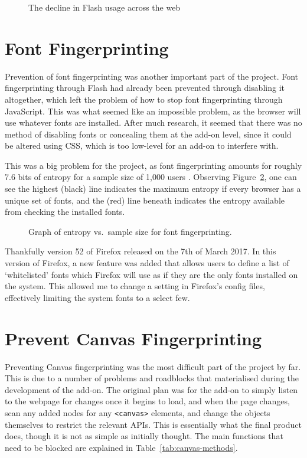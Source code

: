 \begin{figure}[h!]
\centering
\caption{The decline in Flash usage across the web}
\label{fig:flash-usage}
\end{figure}

\section{Font Fingerprinting}

Prevention of font fingerprinting was another important part of the project.
Font fingerprinting through Flash had already been prevented through disabling it altogether, which left the problem of how to stop font fingerprinting through JavaScript.
This was what seemed like an impossible problem, as the browser will use whatever fonts are installed.
After much research, it seemed that there was no method of disabling fonts or concealing them at the add-on level, since it could be altered using CSS, which is too low-level for an add-on to interfere with.

This was a big problem for the project, as font fingerprinting amounts for roughly 7.6 bits of entropy for a sample size of 1,000 users \citep{font-metrics}.
Observing Figure~\ref{fig:font-metrics}, one can see the highest (black) line indicates the maximum entropy if every browser has a unique set of fonts, and the (red) line beneath indicates the entropy available from checking the installed fonts.

\begin{figure}[h!]
\centering
\caption{Graph of entropy vs.\ sample size for font fingerprinting.}
\label{fig:font-metrics}
\end{figure}

Thankfully version 52 of Firefox released on the 7th of March 2017.
In this version of Firefox, a new feature was added that allows users to define a list of `whitelisted' fonts which Firefox will use as if they are the only fonts installed on the system.
This allowed me to change a setting in Firefox's config files, effectively limiting the system fonts to a select few.

\section{Prevent Canvas Fingerprinting}

Preventing Canvas fingerprinting was the most difficult part of the project by far.
This is due to a number of problems and roadblocks that materialised during the development of the add-on.
The original plan was for the add-on to simply listen to the webpage for changes once it begins to load, and when the page changes, scan any added nodes for any \texttt{<canvas>} elements, and change the objects themselves to restrict the relevant APIs.
This is essentially what the final product does, though it is not as simple as initially thought.
The main functions that need to be blocked are explained in Table~\ref{tab:canvas-methods}.

